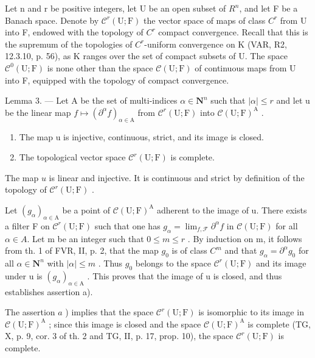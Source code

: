 Let n and r be positive integers, let U be an open subset of \(R^{n}\), and let F be a Banach space. Denote by \(\mathcal{C}^{r}(\mathrm{U};\mathrm{F})\) the vector space of maps of class \(C^{r}\) from U into F, endowed with the topology of \(C^{r}\) compact convergence. Recall that this is the supremum of the topologies of \(C^{r}\)-uniform convergence on K (VAR, R2, 12.3.10, p. 56), as K ranges over the set of compact subsets of U. The space \(\mathcal{C}^{0}(\mathrm{U};\mathrm{F})\) is none other than the space \(\mathcal{C}(\mathrm{U};\mathrm{F})\) of continuous maps from U into F, equipped with the topology of compact convergence.

Lemma 3. --- Let A be the set of multi-indices \(\alpha \in \mathbf{N}^n\) such that \(|\alpha| \leqslant r\) and let u be the linear map \(f \mapsto (\partial^\alpha f)_{\alpha \in \mathrm{A}}\) from \(\mathcal{C}^r(\mathrm{U};\mathrm{F})\) into \(\mathcal{C}(\mathrm{U};\mathrm{F})^{\mathrm{A}}\) .

\begin{enumerate}
\def\labelenumi{\alph{enumi})}
\item
  The map u is injective, continuous, strict, and its image is closed.
\item
  The topological vector space \(\mathcal{C}^{r}(\mathrm{U};\mathrm{F})\) is complete.
\end{enumerate}

The map \(u\) is linear and injective. It is continuous and strict by definition of the topology of \(\mathcal{C}^r (\mathrm{U};\mathrm{F})\) .

Let \((g_{\alpha})_{\alpha\in\mathrm{A}}\) be a point of \(\mathcal{C}(\mathrm{U};\mathrm{F})^{\mathrm{A}}\) adherent to the image of u. There exists a filter F on \(\mathcal{C}^{r}(\mathrm{U};\mathrm{F})\) such that one has \(g_{\alpha}=\lim_{f,\mathcal{F}}\partial^{\alpha}f\) in \(\mathcal{C}(\mathrm{U};\mathrm{F})\) for all \(\alpha\in A\). Let m be an integer such that \(0\leqslant m\leqslant r\) . By induction on m, it follows from th. 1 of FVR, II, p. 2, that the map \(g_{0}\) is of class \(C^{m}\) and that \(g_{\alpha}=\partial^{\alpha}g_{0}\) for all \(\alpha\in\mathbf{N}^{n}\) with \(|\alpha|\leqslant m\) . Thus \(g_{0}\) belongs to the space \(\mathcal{C}^{r}(\mathrm{U};\mathrm{F})\) and its image under u is \((g_{\alpha})_{\alpha\in\mathrm{A}}\) . This proves that the image of u is closed, and thus establishes assertion a).

The assertion \(a\) ) implies that the space \(\mathcal{C}^{r}(\mathrm{U};\mathrm{F})\) is isomorphic to its image in \(\mathcal{C}(\mathrm{U};\mathrm{F})^{\mathrm{A}}\) ; since this image is closed and the space \(\mathcal{C}(\mathrm{U};\mathrm{F})^{\mathrm{A}}\) is complete (TG, X, p. 9, cor. 3 of th. 2 and TG, II, p. 17, prop. 10), the space \(\mathcal{C}^{r}(\mathrm{U};\mathrm{F})\) is complete.

